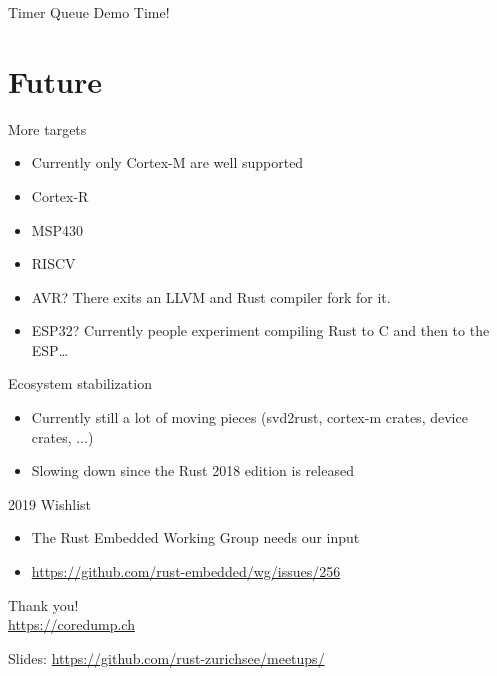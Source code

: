 \documentclass[aspectratio=1610,14pt,t]{beamer}
\begin{document}
\begin{frame}[c,fragile]{Timer Queue}
  Demo Time!
\end{frame}


\section{Future}

\begin{frame}[c]{More targets}
  \begin{itemize}
    \item Currently only Cortex-M are well supported
    \item Cortex-R
    \item MSP430
    \item RISCV
    \item<2-> AVR? There exits an LLVM and Rust compiler fork for it.
    \item<2-> ESP32? Currently people experiment compiling Rust to C and then
      to the ESP\ldots
  \end{itemize}
\end{frame}

\begin{frame}[c]{Ecosystem stabilization}
  \begin{itemize}
    \item Currently still a lot of moving pieces (svd2rust, cortex-m crates,
      device crates, ...)
    \item Slowing down since the Rust 2018 edition is released
  \end{itemize}
\end{frame}

\begin{frame}[c]{2019 Wishlist}
  \begin{itemize}
    \item The Rust Embedded Working Group needs our input
    \item \url{https://github.com/rust-embedded/wg/issues/256}
  \end{itemize}
\end{frame}


{
\begin{frame}[standout]
  \begin{centering}
    {\Huge Thank you!}\\
    {\normalsize \url{https://coredump.ch}}\\
  \end{centering}
  {\small Slides: \url{https://github.com/rust-zurichsee/meetups/}}\\
  \vspace{3cm}
\end{frame}
}
\end{document}
